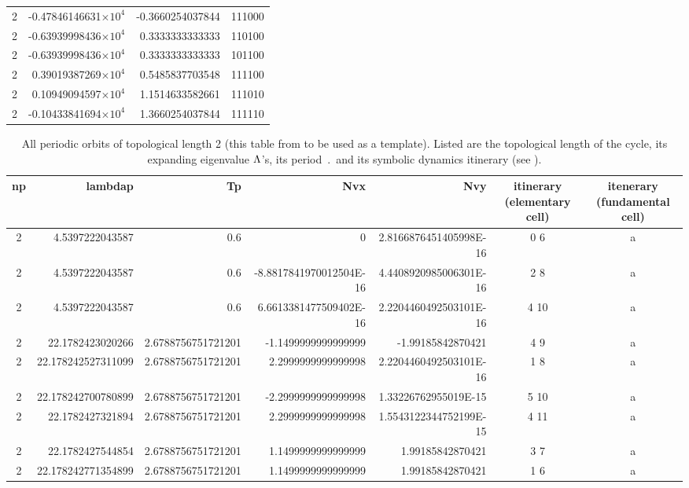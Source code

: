 \begin{table}
\begin{tabular}{|c|r|r|r|}
2 &-0.47846146631$\times 10^4$ & -0.3660254037844 & 111000 \\
2 &-0.63939998436$\times 10^4$ &  0.3333333333333 & 110100 \\
2 &-0.63939998436$\times 10^4$ &  0.3333333333333 & 101100 \\
2 & 0.39019387269$\times 10^4$ &  0.5485837703548 & 111100 \\
2 & 0.10949094597$\times 10^4$ &  1.1514633582661 & 111010 \\
2 &-0.10433841694$\times 10^4$ &  1.3660254037844 & 111110 \\
   \hline
\end{tabular}
\label{tabListLength2}
\end{table}

\begin{table}
\caption[]{ All periodic orbits of topological length 2
(this table from  to be used as a template).
Listed are the topological length of the cycle,
its expanding eigenvalue  $\Lambda$'s, its period $\period{}$
and its symbolic dynamics itinerary (see ).
  }
\begin{tabular*}{\textwidth}{ | c | r | r | r | r | c | c | }
\hline
	np & lambdap & Tp & Nvx & Nvy & itinerary (elementary cell) & itenerary (fundamental cell) \\ \hline
	2 & 4.5397222043587 & 0.6 & 0 & 2.8166876451405998E-16 & 0 6 & a \\ \hline
	2 & 4.5397222043587 & 0.6 & -8.8817841970012504E-16 & 4.4408920985006301E-16 & 2 8 & a \\ \hline
	2 & 4.5397222043587 & 0.6 & 6.6613381477509402E-16 & 2.2204460492503101E-16 & 4 10 & a \\ \hline
	2 & 22.1782423020266 & 2.6788756751721201 & -1.1499999999999999 & -1.99185842870421 & 4 9 & a \\ \hline
	2 & 22.178242527311099 & 2.6788756751721201 & 2.2999999999999998 & 2.2204460492503101E-16 & 1 8 & a \\ \hline
	2 & 22.178242700780899 & 2.6788756751721201 & -2.2999999999999998 & 1.33226762955019E-15 & 5 10 & a \\ \hline
	2 & 22.1782427321894 & 2.6788756751721201 & 2.2999999999999998 & 1.5543122344752199E-15 & 4 11 & a \\ \hline
	2 & 22.1782427544854 & 2.6788756751721201 & 1.1499999999999999 & 1.99185842870421 & 3 7 & a \\ \hline
	2 & 22.178242771354899 & 2.6788756751721201 & 1.1499999999999999 & 1.99185842870421 & 1 6 & a \\ \hline

\end{tabular*}
\end{table}
